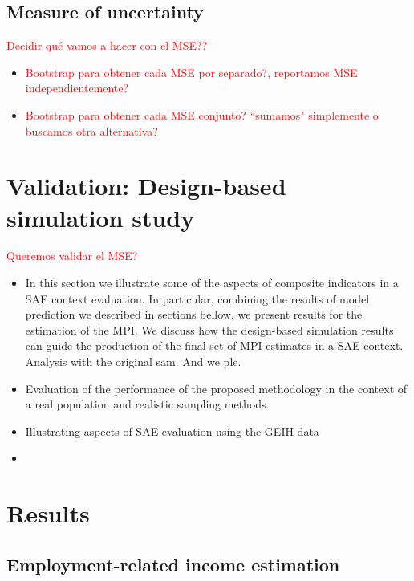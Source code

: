 \documentclass[a4paper, 11pt]{article}
\begin{document}
\subsection{Measure of uncertainty}

\textcolor{red} {Decidir qué vamos a hacer con el MSE??}
\begin{itemize}
    \item \textcolor{red} {Bootstrap para obtener cada MSE por separado?, reportamos MSE independientemente?}
    \item \textcolor{red} {Bootstrap para obtener cada MSE conjunto? ``sumamos" simplemente o buscamos otra alternativa? }
\end{itemize}



\section{Validation: Design-based simulation study}

\textcolor{red} {Queremos validar el MSE?}
\


\begin{itemize}
    \item In this section we illustrate some of the aspects of composite indicators in a SAE context evaluation. In particular, combining the results of model prediction we described
in sections bellow, we present results for the estimation of the MPI. We discuss how the design-based simulation results can guide the production of the
final set of MPI estimates in a SAE context.
Analysis with the original sam. And we ple. %
\item Evaluation of the performance of the proposed methodology in the context of a real population and realistic sampling methods.  
    \item Illustrating aspects of SAE evaluation using the GEIH data %
\item
\end{itemize}

\section{Results}


\subsection{Employment-related income estimation}
\end{document}
